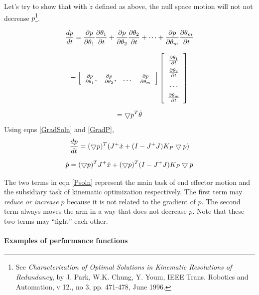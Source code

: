 Let's try to show that with $\dot{z}$ defined as above,
the null space motion will not not decrease $p$\footnote{
See {\it Characterization of Optimal Solutions in Kinematic Resolutions of
Redundancy}, by J. Park, W.K. Chung, Y. Youm,
IEEE Trans. Robotics and Automation, v 12., no 3, pp. 471-478, June 1996.}.

\begin{equation}\label{GradP}
\frac{dp}{dt} =  \frac{\partial p}{\partial \theta_1}\frac{\partial \theta_1}{\partial t} +
\frac{\partial p}{\partial \theta_2}\frac{\partial \theta_2}{\partial t}  +
\dots +
\frac{\partial p}{\partial \theta_m}\frac{\partial \theta_m}{\partial t}
\end{equation}

\begin{equation}
\renewcommand*{\arraystretch}{1.5}
= \left [
\begin{array}{cccc}
\frac{\pd p}{\pd \theta_1}, &
\frac{\pd p}{\pd \theta_2}, &
\dots &
\frac{\pd p}{\pd \theta_m}
\end{array}
\right ]
\left [
\begin{array}{c}
\frac{\pd \theta_1}{\pd t} \\
\frac{\pd \theta_2}{\pd t} \\
\dots \\
\frac{\pd \theta_m}{\pd t} \\
\end{array}
\right]
\end{equation}

\[
= \bigtriangledown p^T \dot{\theta}
\]
Using eqns  \ref{GradSoln} and \ref{GradP},
\[
\frac{dp}{dt} = (\bigtriangledown p)^T (J^{+}\dot{x} + (I-J^{+}J)K_P \bigtriangledown p)
\]

\begin{equation}\label{Psoln}
\dot{p} =(\bigtriangledown p)^T J^{+}\dot{x}  +(\bigtriangledown p)^T (I-J^{+}J)K_P \bigtriangledown p
\end{equation}

The two terms in eqn \ref{Psoln} represent the main task of end effector
motion and the subsidiary task of kinematic optimization respectively.
The first term may {\it reduce or increase} $p$ because it is not related
to the gradient of $p$.
The second term always moves the arm in a way that does not decrease $p$.
Note that these two terms may ``fight'' each other.

\paragraph{Examples of performance functions}

